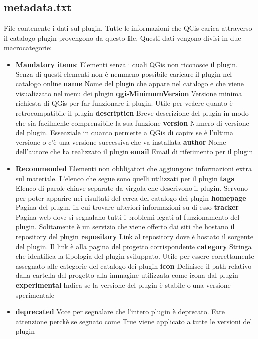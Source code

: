 \subsection{metadata.txt}
File contenente i dati sul plugin. Tutte le informazioni che QGis carica attraverso il catalogo plugin provengono da questo file. 
Questi dati vengono divisi in due macrocategorie:
\begin{itemize}
	\item \textbf{Mandatory items}: Elementi senza i quali QGis non riconosce il plugin. Senza di questi elementi non è nemmeno possibile caricare il plugin nel catalogo online
		\subitem \textbf{name} Nome del plugin che appare nel catalogo e che viene visualizzato nel menu dei plugin
		\subitem \textbf{qgisMinimumVersion} Versione minima richiesta di QGis per far funzionare il plugin. Utile per vedere quanto è retrocompatibile il plugin
		\subitem \textbf{description} Breve descrizione del plugin in modo che sia facilmente comprensibile la sua funzione
		\subitem \textbf{version} Numero di versione del plugin. Essenziale in quanto permette a QGis di capire se è l'ultima versione o c'è una versione successiva che va installata
		\subitem \textbf{author} Nome dell'autore che ha realizzato il plugin
		\subitem \textbf{email} Email di riferimento per il plugin
	\item \textbf{Recommended} Elementi non obbligatori che aggiungono informazioni extra sul materiale. L'elenco che segue sono quelli utilizzati per il plugin
		\subitem \textbf{tags} Elenco di parole chiave separate da virgola che descrivono il plugin. Servono per poter apparire nei risultati del cerca del catalogo dei plugin
		\subitem \textbf{homepage} Pagina del plugin, in cui trovare ulteriori informazioni su di esso
		\subitem \textbf{tracker} Pagina web dove si segnalano tutti i problemi legati al funzionamento del plugin. Solitamente è un servizio che viene offerto dai siti che hostano il repository del plugin
		\subitem \textbf{repository} Link al repository dove è hostato il sorgente del plugin. Il link è alla pagina del progetto corrispondente
		\subitem \textbf{category} Stringa che identifica la tipologia del plugin sviluppato. Utile per essere correttamente assegnato alle categorie del catalogo dei plugin
		\subitem \textbf{icon} Definisce il path relativo dalla cartella del progetto alla immagine utilizzata come icona dal plugin
		\subitem \textbf{experimental} Indica se la versione del plugin è stabile o una versione sperimentale
	\item \textbf{deprecated} Voce per segnalare che l'intero plugin è deprecato. Fare attenzione perchè se segnato come True viene applicato a tutte le versioni del plugin
\end{itemize}

